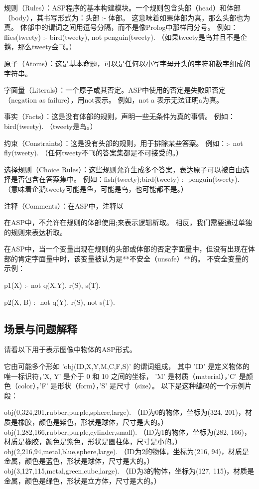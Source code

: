 规则（Rules）：ASP程序的基本构建模块。一个规则包含头部（head）和体部（body），其书写形式为：头部 :- 体部。
这意味着如果体部为真，那么头部也为真。
体部中的谓词之间用逗号分隔，而不是像Prolog中那样用分号。
例如：flies(tweety) :- bird(tweety), not penguin(tweety). （如果tweety是鸟并且不是企鹅，那么tweety会飞。）

原子（Atoms）：这是基本命题，可以是任何以小写字母开头的字符和数字组成的字符串。

字面量（Literals）：一个原子或其否定。ASP中使用的否定是失败即否定（negation as failure），用not表示。
例如，not a 表示无法证明a为真。

事实（Facts）：这是没有体部的规则，声明一些无条件为真的事情。
例如：bird(tweety). （tweety是鸟。）

约束（Constraints）：这是没有头部的规则，用于排除某些答案。
例如：:- not fly(tweety). （任何tweety不飞的答案集都是不可接受的。）

选择规则（Choice Rules）：这些规则允许生成多个答案，表达原子可以被自由选择是否包含在答案集中。
例如：{fish(tweety);bird(tweety)} :- penguin(tweety). （意味着企鹅tweety可能是鱼，可能是鸟，也可能都不是。）

注释（Comments）：在ASP中，注释以%

在ASP中，不允许在规则的体部使用;来表示逻辑析取。
相反，我们需要通过单独的规则来表达析取。

在ASP中，当一个变量出现在规则的头部或体部的否定字面量中，但没有出现在体部的肯定字面量中时，该变量被认为是**不安全（unsafe）**的。
不安全变量的示例：

p1(X) :- not q(X,Y), r(S), s(T).

p2(X, B) :- not q(Y), r(S), not s(T).
\subsection{场景与问题解释}
\label{appendix:scene-question-explanation}
请看以下用于表示图像中物体的ASP形式。

它由可能多个形如 'obj(ID,X,Y,M,C,F,S)' 的谓词组成，
其中 'ID' 是定义物体的唯一标识符，'X, Y' 是介于 0 和 10 之间的坐标，
'M' 是材质（material），'C' 是颜色（color），'F' 是形状（form），'S' 是尺寸（size）。
以下是这种编码的一个示例片段：

obj(0,324,201,rubber,purple,sphere,large). （ID为0的物体，坐标为(324, 201)，材质是橡胶，颜色是紫色，形状是球体，尺寸是大的。）
obj(1,282,166,rubber,purple,cylinder,small). （ID为1的物体，坐标为(282, 166)，材质是橡胶，颜色是紫色，形状是圆柱体，尺寸是小的。）
obj(2,216,94,metal,blue,sphere,large).   （ID为2的物体，坐标为(216, 94)，材质是金属，颜色是蓝色，形状是球体，尺寸是大的。）
obj(3,127,115,metal,green,cube,large).   （ID为3的物体，坐标为(127, 115)，材质是金属，颜色是绿色，形状是立方体，尺寸是大的。）
